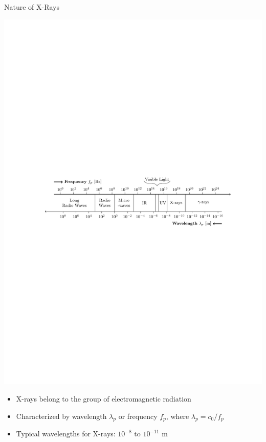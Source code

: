 \begin{frame}{Nature of X-Rays}
    \begin{center}\vspace{0cm}
        \includegraphics[width=0.9\columnwidth]{images/wavelengthFrequ}%
    \end{center}\vspace{-0.1cm}
    \begin{itemize}
        \item X-rays belong to the group of electromagnetic radiation
        \item Characterized by wavelength $\lambda_p$ or frequency $f_p$, where $\lambda_p=c_0/f_p$
        \item Typical wavelengths for X-rays: $10^{-8}$ to $10^{-11}$ m
    \end{itemize}
\end{frame}

